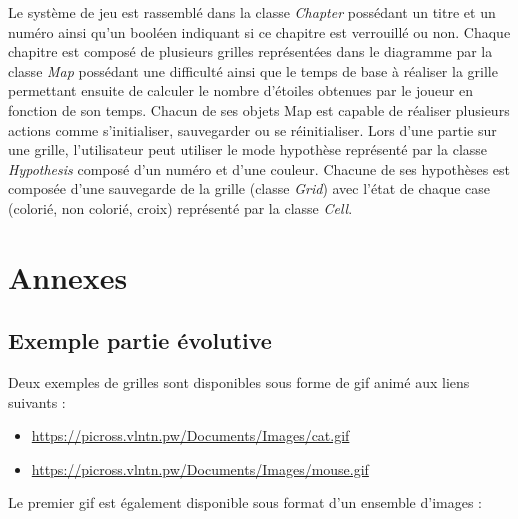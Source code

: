 \documentclass{report}
\begin{document}
 	Le système de jeu est rassemblé dans la classe \textit{Chapter} possédant un titre et un numéro ainsi qu’un booléen indiquant si ce chapitre est verrouillé ou non. Chaque chapitre est composé de plusieurs grilles représentées dans le diagramme par la classe \textit{Map} possédant une difficulté ainsi que le temps de base à réaliser la grille permettant ensuite de calculer le nombre d’étoiles obtenues par le joueur en fonction de son temps. Chacun de ses objets Map est capable de réaliser plusieurs actions comme s’initialiser, sauvegarder ou se réinitialiser. Lors d’une partie sur une grille, l’utilisateur peut utiliser le mode hypothèse représenté par la classe \textit{Hypothesis} composé d’un numéro et d’une couleur. Chacune de ses hypothèses est composée d’une sauvegarde de la grille (classe \textit{Grid}) avec l’état de chaque case (colorié, non colorié, croix) représenté par la classe \textit{Cell}.


\chapter{Annexes}

	\section{Exemple partie évolutive}
	
		Deux exemples de grilles sont disponibles sous forme de gif animé aux liens suivants :
		 \begin{itemize}
    		 \item \url{https://picross.vlntn.pw/Documents/Images/cat.gif}
   	   	 \item \url{https://picross.vlntn.pw/Documents/Images/mouse.gif}
		 \end{itemize}
		
		Le premier gif est également disponible sous format d'un ensemble d'images :
	
\end{document}
